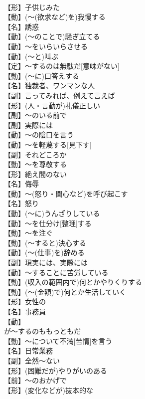 \documentclass[8pt]{extreport}
\begin{document}
\begin{CJK}{UTF8}{min}
\\	【形】子供じみた
\\	【動】(～(欲求など)を)我慢する
\\	【名】誘惑
\\	【動】(～のことで)騒ぎ立てる
\\	【動】～をいらいらさせる
\\	【動】(～と)叫ぶ
\\	【定】～するのは無駄だ[意味がない]
\\	【動】(～に)口答えする
\\	【名】独裁者、ワンマンな人
\\	【副】言ってみれば、例えて言えば
\\	【形】(人・言動が)礼儀正しい
\\	【副】～のいる前で
\\	【副】実際には
\\	【動】～の陰口を言う
\\	【動】～を軽蔑する[見下す]
\\	【副】それどころか
\\	【動】～を尊敬する
\\	【形】絶え間のない
\\	【名】侮辱
\\	【動】～(怒り・関心など)を呼び起こす
\\	【名】怒り
\\	【動】(～に)うんざりしている
\\	【動】～を仕分け[整理]する
\\	【動】～を注ぐ
\\	【動】(～すると)決心する
\\	【動】(～(仕事)を)辞める
\\	【副】現実には、実際には
\\	【動】～することに苦労している
\\	【動】(収入の範囲内で)何とかやりくりする
\\	【動】(～(金額)で)何とか生活していく
\\	【形】女性の
\\	【名】事務員
\\	【動】
\\	が～するのももっともだ
\\	【動】～について不満[苦情]を言う
\\	【名】日常業務
\\	【副】全然～ない
\\	【形】(困難だが)やりがいのある
\\	【前】～のおかげで
\\	【形】(変化などが)抜本的な

\end{CJK}
\end{document}
